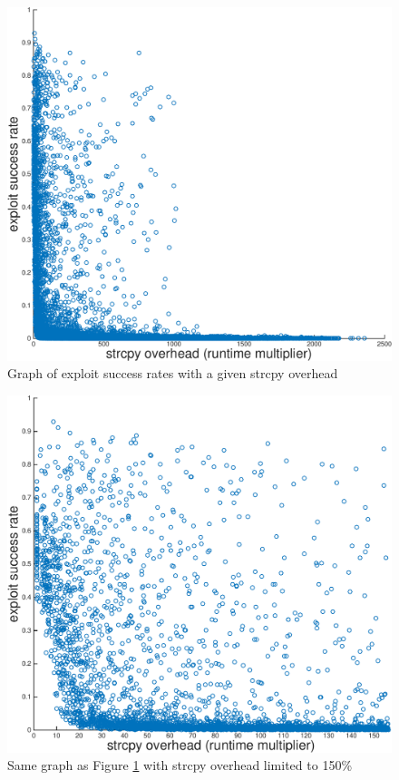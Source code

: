 \documentclass[letterpaper,twocolumn,10pt]{article}
\begin{document}
\begin{figure}
\centering
\includegraphics[width=\columnwidth]{successrate.pdf}
\caption{Graph of exploit success rates with a given strcpy overhead}
\label{fig_successrate}
\end{figure}

\begin{figure}
\centering
\includegraphics[width=\columnwidth]{successratezoom.pdf}
\caption{Same graph as Figure \ref{fig_successrate} with strcpy overhead limited to 150\%}
\label{fig_successratezoom}
\end{figure}
\end{document}
